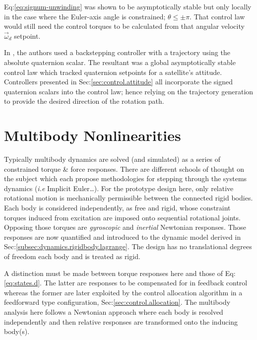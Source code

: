 Eq:\ref{eq:signum-unwinding} was shown to be asymptotically stable but only locally in the case where the Euler-axis angle is constrained; $\theta\leq \pm\pi$. That control law  would still need the control torques to be calculated from that angular velocity $\vec{\omega}_d$ setpoint.
\par
In \cite{intelligentbackstep}, the authors used a backstepping controller with a trajectory using the absolute quaternion scalar. The resultant was a global asymptotically stable control law which tracked quaternion setpoints for a satellite's attitude. Controllers presented in Sec:\ref{sec:control.attitude} all incorporate the signed quaternion scalars into the control law;  hence relying on the trajectory generation to provide the desired direction of the rotation path.
\section{Multibody Nonlinearities}
\label{sec:dynamics.nonlinearities}
Typically multibody dynamics are solved (and simulated) as a series of constrained torque \& force responses. There are different schools of thought on the subject which each propose methodologies for stepping through the systems dynamics (\emph{i.e} Implicit Euler\cite{physicallybased,multibodydynamics}\ldots). For the prototype design here, only relative rotational motion is mechanically permissible between the connected rigid bodies. Each body is considered independently, as free and rigid, whose constraint torques induced from excitation are imposed onto sequential rotational joints. Opposing those torques are \emph{gyroscopic} and \emph{inertial} Newtonian responses. Those responses are now quantified and introduced to the dynamic model derived in Sec:\ref{subsec:dynamics.rigidbody.lagrange}. The design has no translational degrees of freedom each body and is treated as rigid.
\par
A distinction must be made between torque responses here and those of Eq:\ref{eq:states.d}. The latter are responses to be compensated for in feedback control whereas the former are later exploited by the control allocation algorithm in a feedforward type configuration, Sec:\ref{sec:control.allocation}. The multibody analysis here follows a Newtonian approach where each body is resolved independently and then relative responses are transformed onto the inducing body(s). 

